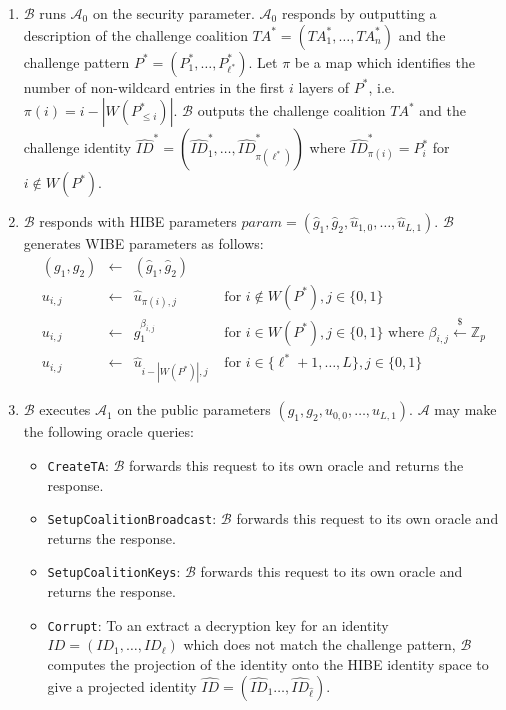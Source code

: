 \documentclass[10pt]{llncs}
\newcommand{\A}{\mathcal{A}}
\newcommand{\B}{\mathcal{B}}
\newcommand{\Zbb}{\mathbb{Z}}
\newcommand{\ID}{\mathit{ID}}
\newcommand{\TA}{\mathit{TA}}
\newcommand{\getsr}{\stackrel{{\scriptscriptstyle\$}}{\gets}}
\begin{document}
\begin{enumerate}
\item $\B$ runs $\A_{0}$ on the security parameter. $\A_{0}$ responds by
outputting a description of the challenge coalition $\TA^{*} =
(\TA^{*}_{1},\ldots,\TA^{*}_{n})$ and the challenge pattern
$P^{*} = (P^{*}_{1},\ldots,P^{*}_{\ell^{*}})$. Let $\pi$ be a
map which identifies the number of non-wildcard entries in the
first $i$ layers of $P^{*}$, i.e. $\pi(i) = i - |W(P^{*}_{\leq
i})|$. $\B$ outputs the challenge coalition $\TA^{*}$ and the
challenge identity
$\hat{\ID}^{*}=(\hat{\ID}^{*}_{1},\ldots,\hat{\ID}^{*}_{\pi(\ell^{*})})$
where $\hat{\ID}^{*}_{\pi(i)} = P^{*}_{i}$ for $i\notin
W(P^{*})$.
\item $\B$ responds with HIBE parameters $\mathit{param} = (\hat{g}_{1},\hat{g}_{2},\hat{u}_{1,0},\ldots,\hat{u}_{L,1})$. $\B$ generates WIBE parameters as follows:
    \begin{displaymath}
    \begin{array}{rcll}
    (g_{1},g_{2}) &\gets& (\hat{g}_{1},\hat{g}_{2})&\\
    u_{i,j} &\gets& \hat{u}_{\pi(i),j} &\mbox{ for } i\notin W(P^{*}), j\in\{0,1\}\\
    u_{i,j} &\gets& g_{1}^{\beta_{i,j}} &\mbox{ for } i\in W(P^{*}), j\in\{0,1\}\mbox{ where } \beta_{i,j}\getsr \Zbb_{p}\\
    u_{i,j} &\gets& \hat{u}_{i-|W(P^{*})|,j} &\mbox{ for } i\in \{\ell^{*}+1,\ldots,L\}, j\in\{0,1\}
    \end{array}
    \end{displaymath}
\item $\B$ executes $\A_{1}$ on the public parameters $(g_{1},g_{2},u_{0,0},\ldots,u_{L,1})$. $\A$ may make the following oracle queries:
    \begin{itemize}
    \item \texttt{CreateTA}: $\B$ forwards this request to its own oracle and returns the response.
    \item \texttt{SetupCoalitionBroadcast}: $\B$ forwards this request to its own oracle and returns the response.
    \item \texttt{SetupCoalitionKeys}: $\B$ forwards this request to its own oracle and returns the response.
    \item \texttt{Corrupt}: To an extract a decryption key for an identity $\ID=(\ID_{1},\ldots,\ID_{\ell})$ which does not match the challenge pattern, $\B$ computes the projection of the identity onto the HIBE identity space to give a projected identity $\hat{\ID}=(\hat{\ID}_{1}\ldots, \hat{\ID}_{\hat{\ell}})$.

\end{itemize}
\end{enumerate}
\end{document}
